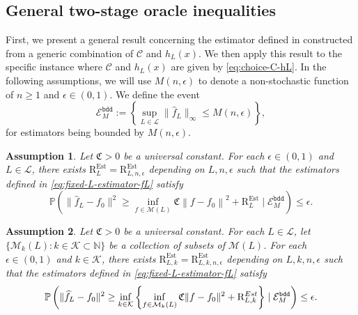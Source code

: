 \documentclass[12pt]{article}
\newtheorem{assumption}{Assumption}[section]
\begin{document}
\subsection{General two-stage oracle inequalities}

First, we present a general result concerning the estimator defined in  constructed from a generic combination of $\mathcal{C}$ and $h_L(x)$. We then apply this result to the specific instance where $\mathcal{C}$ and $h_L(x)$ are given by \eqref{eq:choice-C-hL}. In the following assumptions, we will use $M(n,\epsilon)$ to denote a non-stochastic function of $n \geq 1$ and $\epsilon \in (0,1)$. We define the event
\begin{equation}
\mathcal{E}_M^{\mathtt{bdd}}:=\left\{\sup _{L \in \mathcal{L}}\|\widehat{f}_L\|_{\infty} \leq M(n, \epsilon)\right\},
\end{equation}
for estimators being bounded by $M(n,\epsilon)$. 

\begin{assumption}\label{as:oracle-est}
Let $\mathfrak{C} > 0$ be a universal constant. For each $\epsilon \in (0, 1)$ and $L\in \mathcal{L}$, there exists $\mathrm{R}_{L}^{\mathrm{Est}} = \mathrm{R}_{L,n,\epsilon}^{\mathrm{Est}}$ depending on $L,n,\epsilon$ such that the estimators defined in \eqref{eq:fixed-L-estimator-fL} satisfy 
\begin{equation}\label{eq:oracle-est}
\mathbb{P}\left(\|\widehat{f}_L-f_0\|^2 \geq \inf_{f \in \mathcal{M}(L)}\mathfrak{C}\left\|f-f_0\right\|^2+\mathrm{R}_{L}^{\mathrm{Est}}\mid \mathcal{E}^{\mathtt{bdd}}_{M}\right) \leq \epsilon.
\end{equation}
\end{assumption}

\begin{assumption}\label{as:oracle-est-adaptive}
Let $\mathfrak{C} > 0$ be a universal constant. For each $L\in\mathcal{L}$, let $\{\mathcal{M}_k(L): k \in \mathcal{K}\subset\mathbb{N}\}$ be a collection of subsets of $\mathcal{M}(L)$. For each $\epsilon \in (0,1)$ and $k \in \mathcal{K}$, there exists $\mathrm{R}_{L,k}^{\mathrm{Est}} = \mathrm{R}_{L,k,n,\epsilon}^{\mathrm{Est}}$ depending on $L, k, n, \epsilon$ such that the estimators defined in \eqref{eq:fixed-L-estimator-fL} satisfy
    \begin{equation}
\mathbb{P}\left(\|\widehat{f}_L-f_0\|^2 \geq \inf_{k \in\mathcal{K} }\left\{\inf_{f\in \mathcal{M}_k(L)}\mathfrak{C}\| f-f_0\|^2 + \mathrm{R}_{L,k}^{\rm Est}\right\}\mid  \mathcal{E}_M^{\mathtt{bdd}}\right) \leq \epsilon.
\end{equation}
\end{assumption}
\end{document}
